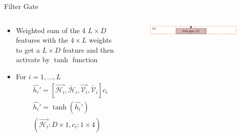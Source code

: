 \documentclass[compress]{beamer}
\begin{document}
\begin{frame}{Filter Gate}
    \begin{columns}
        \begin{column}[T]{.5\textwidth}
            \begin{itemize}
                \item Weighted sum of the 4 $L\times D$ features with the $4 \times L$ weights to get a $L \times D$ feature and then activate by $\tanh$ function
                \item For $i=1,\dots,L$
                    \begin{align*}
                        & \widehat{h_i}' = [\overrightarrow{\mathcal{H}_i}, \overleftarrow{\mathcal{H}_i}, \overrightarrow{\mathcal{V}_i}, \overleftarrow{\mathcal{V}_i}]c_i \\
                        & \widehat{h_i}'=\tanh(\widehat{h_i}') \\
                        & (\overrightarrow{\mathcal{H}_i}: D\times 1, c_i: 1\times 4)
                    \end{align*}
        \end{itemize}
        \end{column}
        \begin{column}[T]{.5\textwidth}
            \begin{figure}
                \includegraphics[width=\textwidth]{fg}
            \end{figure}
        \end{column}
    \end{columns}
\end{frame}
\end{document}
